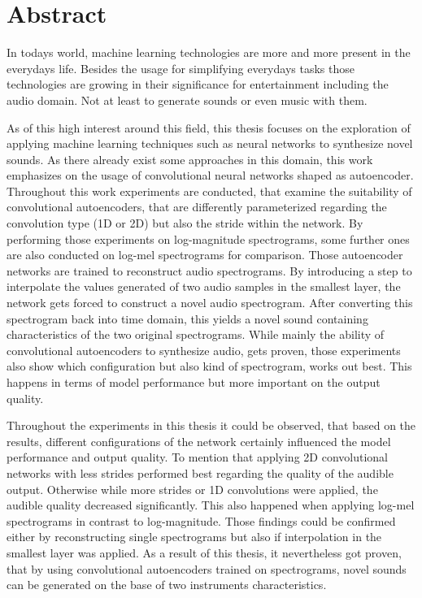 \chapter{Abstract}

In todays world, machine learning technologies are more and more present in the everydays life. Besides the usage for simplifying everydays tasks those technologies are growing in their significance for entertainment including the audio domain. Not at least to generate sounds or even music with them. 

As of this high interest around this field, this thesis focuses on the exploration of applying machine learning techniques such as neural networks to synthesize novel sounds. As there already exist some approaches in this domain, this work emphasizes on the usage of convolutional neural networks shaped as autoencoder. Throughout this work experiments are conducted, that examine the suitability of convolutional autoencoders, that are differently parameterized regarding the convolution type (1D or 2D) but also the stride within the network. By performing those experiments on log-magnitude spectrograms, some further ones are also conducted on log-mel spectrograms for comparison. Those autoencoder networks are trained to reconstruct audio spectrograms. By introducing a step to interpolate the values generated of two audio samples in the smallest layer, the network gets forced to construct a novel audio spectrogram. After converting this spectrogram back into time domain, this yields a novel sound containing characteristics of the two original spectrograms. While mainly the ability of convolutional autoencoders to synthesize audio, gets proven, those experiments also show which configuration but also kind of spectrogram, works out best. This happens in terms of model performance but more important on the output quality. 

Throughout the experiments in this thesis it could be observed, that based on the results, different configurations of the network certainly influenced the model performance and output quality. To mention that applying 2D convolutional networks with less strides performed best regarding the quality of the audible output. Otherwise while more strides or 1D convolutions were applied, the audible quality decreased significantly. This also happened when applying log-mel spectrograms in contrast to log-magnitude. Those findings could be confirmed either by reconstructing single spectrograms but also if interpolation in the smallest layer was applied. As a result of this thesis, it nevertheless got proven, that by using convolutional autoencoders trained on spectrograms, novel sounds can be generated on the base of two instruments characteristics.
